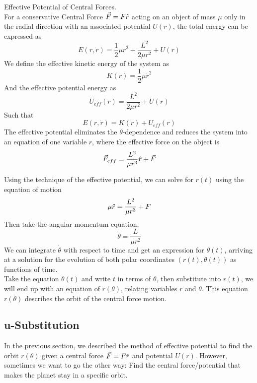 \documentclass[11pt]{article}
\theoremstyle{gangnamstyle}{\newtheorem{definition}{Definition}[]}
\theoremstyle{gangnamstyle}{\newtheorem{example}{Example}[]}
\theoremstyle{gangnamstyle}{\newtheorem{problem}{Problem}[]}
\theoremstyle{gangnamstyle}{\newtheorem{warning}{Warning}[]}
\begin{document}
\begin{definition}
Effective Potential of Central Forces. \\
For a conservative Central Force $\Vec{F} = F \Hat{r}$ acting on an object of mass $\mu$ only in the radial direction with an associated potential $U(r)$, the total energy can be expressed as
\begin{equation}
E(r, \Dot{r}) = \frac{1}{2}\mu\Dot{r}^2 + \frac{L^2}{2\mu r^2} + U(r)
\end{equation}
We define the effective kinetic energy of the system as 
\begin{equation}
K(\Dot{r}) = \frac{1}{2}\mu\Dot{r}^2
\end{equation}
And the effective potential energy as 
\begin{equation}
U_{eff}(r) = \frac{L^2}{2\mu r^2} + U(r)
\end{equation}
Such that
\begin{equation}
E(r, \Dot{r}) = K(\Dot{r}) + U_{eff}(r)
\end{equation}
The effective potential eliminates the $\theta$-dependence and reduces the system into an equation of one variable $r$, where the effective force on the object is 
\begin{equation}
\Vec{F}_{eff} = \frac{L^2}{\mu r^3}\Hat{r} + \Vec{F}
\end{equation}
\end{definition}

Using the technique of the effective potential, we can solve for $r(t)$ using the equation of motion
\[ \mu\Ddot{r} = \frac{L^2}{\mu r^3} + F \]
Then take the angular momentum equation, 
\[ \Dot{\theta} = \frac{L}{\mu r^2} \]
We can integrate $\Dot{\theta}$ with respect to time and get an expression for $\theta(t)$, arriving at a solution for the evolution of both polar coordinates $(r(t), \theta(t))$ as functions of time. \\

Take the equation $\theta(t)$ and write $t$ in terms of $\theta$, then substitute into $r(t)$, we will end up with an equation of $r(\theta)$, relating variables $r$ and $\theta$. This equation $r(\theta)$ describes the orbit of the central force motion. 

\subsection{u-Substitution}

In the previous section, we described the method of effective potential to find the orbit $r(\theta)$ given a central force $\Vec{F} = F\Hat{r}$ and potential $U(r)$. However, sometimes we want to go the other way: Find the central force/potential that makes the planet stay in a specific orbit. \\
\end{document}

